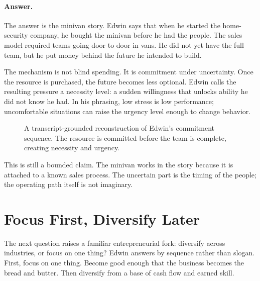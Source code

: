 \paragraph{Answer.}
The answer is the minivan story. Edwin says that when he started the home-security company, he bought the minivan before he had the people. The sales model required teams going door to door in vans. He did not yet have the full team, but he put money behind the future he intended to build.

The mechanism is not blind spending. It is commitment under uncertainty. Once the resource is purchased, the future becomes less optional. Edwin calls the resulting pressure a necessity level: a sudden willingness that unlocks ability he did not know he had. In his phrasing, low stress is low performance; uncomfortable situations can raise the urgency level enough to change behavior.

\begin{figure}
\centering
{}
\caption{A transcript-grounded reconstruction of Edwin's commitment sequence. The resource is committed before the team is complete, creating necessity and urgency.}
\end{figure}

This is still a bounded claim. The minivan works in the story because it is attached to a known sales process. The uncertain part is the timing of the people; the operating path itself is not imaginary.

\section{Focus First, Diversify Later}

The next question raises a familiar entrepreneurial fork: diversify across industries, or focus on one thing? Edwin answers by sequence rather than slogan. First, focus on one thing. Become good enough that the business becomes the bread and butter. Then diversify from a base of cash flow and earned skill.

